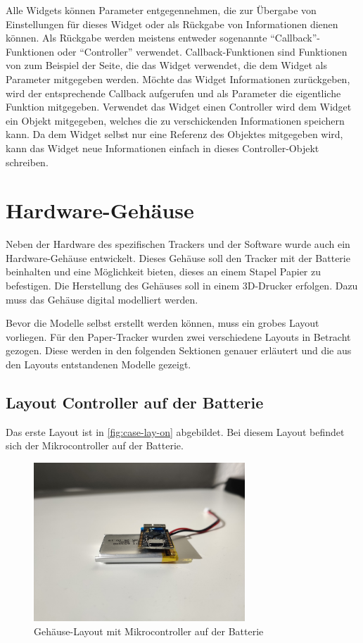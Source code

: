 Alle Widgets können Parameter entgegennehmen, die zur Übergabe von Einstellungen für dieses Widget oder als Rückgabe
von Informationen dienen können.
Als Rückgabe werden meistens entweder sogenannte \enquote{Callback}-Funktionen oder \enquote{Controller} verwendet.
Callback-Funktionen sind Funktionen von zum Beispiel der Seite, die das Widget verwendet, die dem Widget als Parameter
mitgegeben werden.
Möchte das Widget Informationen zurückgeben, wird der entsprechende Callback aufgerufen und als Parameter die eigentliche
Funktion mitgegeben.
Verwendet das Widget einen Controller wird dem Widget ein Objekt mitgegeben, welches die zu verschickenden
Informationen speichern kann.
Da dem Widget selbst nur eine Referenz des Objektes mitgegeben wird, kann das Widget neue Informationen einfach in dieses
Controller-Objekt schreiben.

\section{Hardware-Gehäuse}

Neben der Hardware des spezifischen Trackers und der Software wurde auch ein Hardware-Gehäuse entwickelt.
Dieses Gehäuse soll den Tracker mit der Batterie beinhalten und eine Möglichkeit bieten, dieses an einem Stapel Papier zu befestigen.
Die Herstellung des Gehäuses soll in einem 3D-Drucker erfolgen.
Dazu muss das Gehäuse digital modelliert werden.

Bevor die Modelle selbst erstellt werden können, muss ein grobes Layout vorliegen.
Für den Paper-Tracker wurden zwei verschiedene Layouts in Betracht gezogen.
Diese werden in den folgenden Sektionen genauer erläutert und die aus den Layouts entstandenen Modelle gezeigt.

\subsection{Layout Controller auf der Batterie}
Das erste Layout ist in \autoref{fig:case-lay-on} abgebildet.
Bei diesem Layout befindet sich der Mikrocontroller auf der Batterie.

\begin{figure}[htbp]
	\includegraphics[width=300px]{images/case/pico_on_battery.jpg}
	\centering
	\caption{Gehäuse-Layout mit Mikrocontroller auf der Batterie}
	\label{fig:case-lay-on}
\end{figure}

